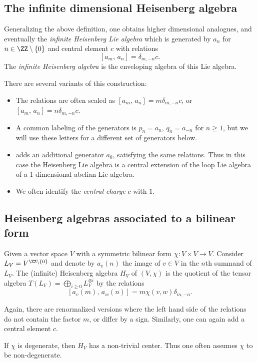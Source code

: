 \documentclass{ck-article}
\begin{document}
\subsection{The infinite dimensional Heisenberg algebra}\label{sec:infinite_Heisenberg}

Generalizing the above definition, one obtains higher dimensional analogues, and eventually the \emph{infinite Heisenberg Lie algebra} which is generated by $a_n$ for $n \in \ZZ \setminus \{0\}$ and central element $c$ with relations
\[
    [a_m,\, a_n] = \delta_{m,-n}c.
\]
The \emph{infinite Heisenberg algebra} is the enveloping algebra of this Lie algebra.

There are several variants of this construction:
\begin{itemize}
    \item The relations are often scaled as $[a_m,\, a_n] = m\delta_{m,-n}c$, or $[a_m,\, a_n] = n\delta_{m,-n}c$.
    \item A common labeling of the generators is $p_n = a_n$, $q_n = a_{-n}$ for $n \ge 1$, but we will use these letters for a different set of generators below.
    \item \cite[Definition~4.1]{Gordon:2009:InfiniteDimensionalLieAlgebras} adds an additional generator $a_0$, satisfying the same relations. Thus in this case the Heisenberg Lie algebra is a central extension of the loop Lie algebra of a 1-dimensional abelian Lie algebra.
    \item We often identify the \emph{central charge} $c$ with $1$.
\end{itemize}


\subsection{Heisenberg algebras associated to a bilinear form}

Given a vector space $V$ with a symmetric bilinear form $\chi\colon V \times V \to V$.
Consider $L_V = V^{\ZZ \setminus \{0\}}$ and denote by $a_{v}(n)$ the image of $v \in V$ in the $n$th summand of $L_V$.
The (infinite) Heisenberg algebra $H_V$ of $(V, \chi)$ is the quotient of the tensor algebra $T(L_V) = \bigoplus_{i \ge 0} L_V^{\otimes i}$ by the relations
\[
    [a_v(m),\, a_w(n)] = m\chi(v,w)\delta_{m,-n}.
\]
\begin{Remarks}
    Again, there are renormalized versions where the left hand side of the relations do not contain the factor $m$, or differ by a sign.
    Similarly, one can again add a central element $c$.

    If $\chi$ is degenerate, then $H_V$ has a non-trivial center.
    Thus one often assumes $\chi$ to be non-degenerate.
\end{Remarks}
\end{document}
